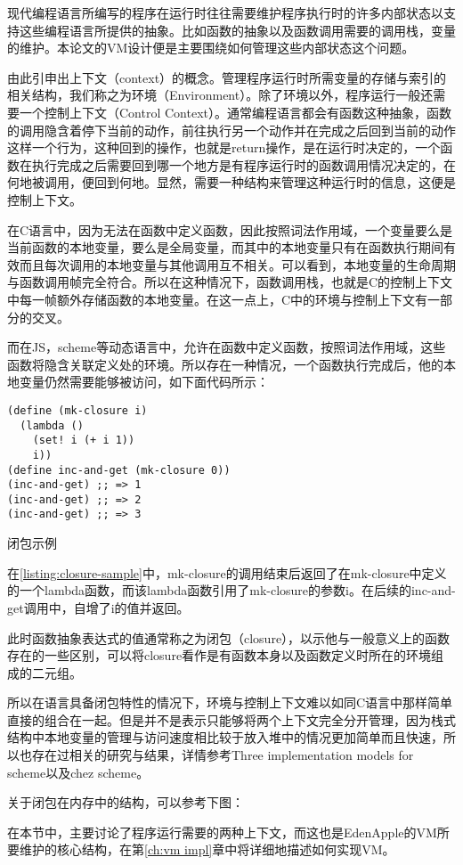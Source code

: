 现代编程语言所编写的程序在运行时往往需要维护程序执行时的许多内部状态以支持这些编程语言所提供的抽象。比如函数的抽象以及函数调用需要的调用栈，变量的维护。本论文的VM设计便是主要围绕如何管理这些内部状态这个问题。

由此引申出上下文（context）的概念。管理程序运行时所需变量的存储与索引的相关结构，我们称之为环境（Environment）。除了环境以外，程序运行一般还需要一个控制上下文（Control Context）。通常编程语言都会有函数这种抽象，函数的调用隐含着停下当前的动作，前往执行另一个动作并在完成之后回到当前的动作这样一个行为，这种回到的操作，也就是return操作，是在运行时决定的，一个函数在执行完成之后需要回到哪一个地方是有程序运行时的函数调用情况决定的，在何地被调用，便回到何地。显然，需要一种结构来管理这种运行时的信息，这便是控制上下文。

在C语言中，因为无法在函数中定义函数，因此按照词法作用域，一个变量要么是当前函数的本地变量，要么是全局变量，而其中的本地变量只有在函数执行期间有效而且每次调用的本地变量与其他调用互不相关。可以看到，本地变量的生命周期与函数调用帧完全符合。所以在这种情况下，函数调用栈，也就是C的控制上下文中每一帧额外存储函数的本地变量。在这一点上，C中的环境与控制上下文有一部分的交叉。

而在JS，scheme等动态语言中，允许在函数中定义函数，按照词法作用域，这些函数将隐含关联定义处的环境。所以存在一种情况，一个函数执行完成后，他的本地变量仍然需要能够被访问，如下面代码所示：

\begin{code}
\begin{verbatim}
(define (mk-closure i)
  (lambda ()
    (set! i (+ i 1))
    i))
(define inc-and-get (mk-closure 0))
(inc-and-get) ;; => 1
(inc-and-get) ;; => 2
(inc-and-get) ;; => 3
\end{verbatim}
\caption{闭包示例}
\label{listing:closure-sample}
\end{code}

在\ref{listing:closure-sample}中，mk-closure的调用结束后返回了在mk-closure中定义的一个lambda函数，而该lambda函数引用了mk-closure的参数i。在后续的inc-and-get调用中，自增了i的值并返回。

此时函数抽象表达式的值通常称之为闭包（closure），以示他与一般意义上的函数存在的一些区别，可以将closure看作是有函数本身以及函数定义时所在的环境组成的二元组。

所以在语言具备闭包特性的情况下，环境与控制上下文难以如同C语言中那样简单直接的组合在一起。但是并不是表示只能够将两个上下文完全分开管理，因为栈式结构中本地变量的管理与访问速度相比较于放入堆中的情况更加简单而且快速，所以也存在过相关的研究与结果，详情参考Three implementation models for scheme\cite{dybvig87timpl}以及chez scheme。 

关于闭包在内存中的结构，可以参考下图：

%
%

在本节中，主要讨论了程序运行需要的两种上下文，而这也是EdenApple的VM所要维护的核心结构，在第\ref{ch:vm impl}章中将详细地描述如何实现VM。